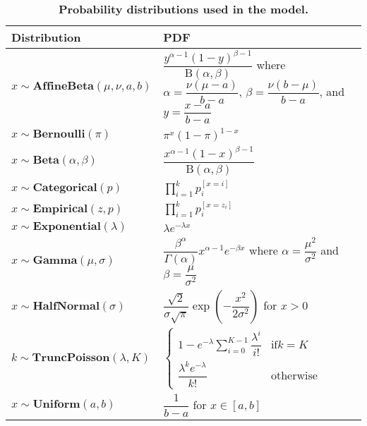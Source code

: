 \begin{table}
\caption{\label{tab:distributions} \textbf{Probability distributions used in the model.}}
\begin{tabular}{l l}
\toprule
Distribution & PDF \\
\midrule
$x \sim \mathbf{AffineBeta}(\mu, \nu, a, b)$ &
    $\dfrac{y^{\alpha-1}(1-y)^{\beta-1}}{\text{B}(\alpha, \beta)}$
    where $\alpha=\dfrac{\nu (\mu-a)}{b-a}$, $\beta=\dfrac{\nu (b-\mu)}{b-a}$, and $y = \dfrac{x-a}{b-a}$ \\
$x \sim \mathbf{Bernoulli}(\pi)$ &
    $\pi^x (1-\pi)^{1-x}$ \\
$x \sim \mathbf{Beta}(\alpha, \beta)$ &
    $\dfrac{x^{\alpha-1}(1-x)^{\beta-1}}{\text{B}(\alpha, \beta)}$ \\
$x \sim \mathbf{Categorical}(p)$ &
    $\prod_{i=1}^k p_i^{[x=i]}$ \\
$x \sim \mathbf{Empirical}(z, p)$ &
    $\prod_{i=1}^k p_i^{[x=z_i]}$ \\
$x \sim \mathbf{Exponential}(\lambda)$ &
    $\lambda e^{-\lambda x}$ \rule{0pt}{3ex} \\
$x \sim \mathbf{Gamma}(\mu, \sigma)$ &
    $\dfrac{\beta^\alpha}{\Gamma(\alpha)}x^{\alpha-1} e^{-\beta x}$
    where $\alpha = \dfrac{\mu^2}{\sigma^2}$ and $\beta = \dfrac{\mu}{\sigma^2}$ \\
$x \sim \mathbf{HalfNormal}(\sigma)$ &
    $\dfrac{\sqrt{2}}{\sigma \sqrt{\pi}} \exp \left( -\dfrac{x^2}{2\sigma^2} \right)$
    for  $x > 0$ \\
$k \sim \mathbf{TruncPoisson}(\lambda, K) $ & $ \begin{cases} 1 - e^{-\lambda} \sum_{i=0}^{K-1} \dfrac{\lambda^i}{i!} & \mathrm{if } k = K \\ \dfrac{\lambda^k e^{-\lambda}}{k!} & \mathrm{otherwise} \end{cases} $ \\
$x \sim \mathbf{Uniform}(a, b)$ &
    $\dfrac{1}{b-a}$ for $x \in [a, b]$ \\
\bottomrule
\end{tabular}
\end{table}
